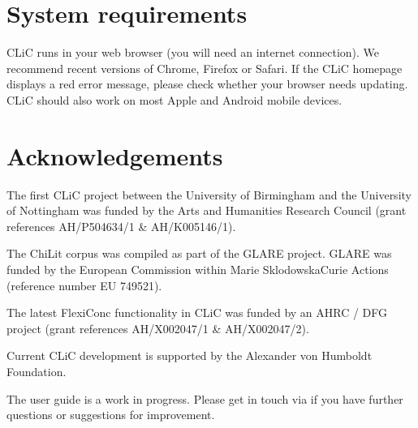 \documentclass[letterpaper,10pt,english]{sphinxmanual}
\begin{document}
\section{System requirements}
\label{\detokenize{introduction:system-requirements}}
\sphinxAtStartPar
CLiC runs in your web browser (you will need an internet connection).
We recommend recent versions of Chrome, Firefox or Safari. If the CLiC
homepage displays a red error message, please check whether your browser
needs updating. CLiC should also work on most Apple and Android mobile
devices.


\section{Acknowledgements}
\label{\detokenize{introduction:acknowledgements}}
\sphinxAtStartPar
The first CLiC project between the University of Birmingham and the
University of Nottingham was funded by the Arts and Humanities Research
Council (grant references AH/P504634/1 \& AH/K005146/1).

\sphinxAtStartPar
The ChiLit corpus was compiled as part of the GLARE project. GLARE was
funded by the European Commission within Marie Sklodowska\sphinxhyphen{}Curie Actions
(reference number EU 749521).

\sphinxAtStartPar
The latest FlexiConc functionality in CLiC was funded by an AHRC / DFG
project (grant references AH/X002047/1 \& AH/X002047/2).

\sphinxAtStartPar
Current CLiC development is supported by the Alexander von Humboldt
Foundation.

\sphinxAtStartPar
The user guide is a work in progress. Please get in touch via
 if you have further questions or suggestions for
improvement.

\sphinxstepscope
\end{document}
